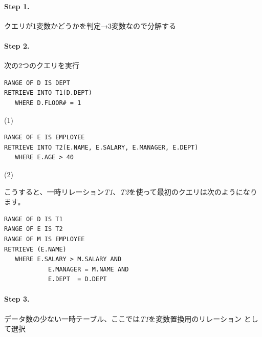 \paragraph{Step 1. }
クエリが1変数かどうかを判定→3変数なので分解する

\paragraph{Step 2. }
次の2つのクエリを実行

\begin{center}
 \begin{minipage}{0.8\textwidth}
  \begin{lstlisting}
RANGE OF D IS DEPT
RETRIEVE INTO T1(D.DEPT)
   WHERE D.FLOOR# = 1
  \end{lstlisting}
 \end{minipage}
 \begin{minipage}{0.05\textwidth}
  (1)
 \end{minipage}

 \begin{minipage}{0.8\textwidth}
  \begin{lstlisting}
RANGE OF E IS EMPLOYEE
RETRIEVE INTO T2(E.NAME, E.SALARY, E.MANAGER, E.DEPT)
   WHERE E.AGE > 40
  \end{lstlisting}
 \end{minipage}
 \begin{minipage}{0.05\textwidth}
  (2)
 \end{minipage}
\end{center}

こうすると、一時リレーション{\it T1}、{\it T2}を使って最初のクエリは次のようになります。

\begin{center}
 \begin{minipage}{0.8\textwidth}
  \begin{lstlisting}
RANGE OF D IS T1
RANGE OF E IS T2
RANGE OF M IS EMPLOYEE
RETRIEVE (E.NAME)
   WHERE E.SALARY > M.SALARY AND
            E.MANAGER = M.NAME AND
            E.DEPT  = D.DEPT
  \end{lstlisting}
 \end{minipage}
\end{center}

\paragraph{Step 3.}
データ数の少ない一時テーブル、ここでは{\it T1}を変数置換用のリレーション
として選択

